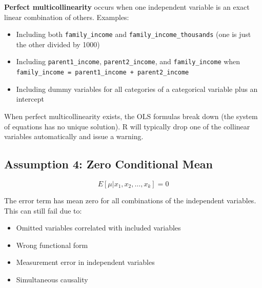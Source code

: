 \documentclass[
  letterpaper,
  DIV=11,
  numbers=noendperiod]{scrreprt}
\providecommand{\tightlist}{%
  \setlength{\itemsep}{0pt}\setlength{\parskip}{0pt}}
\begin{document}
\begin{tcolorbox}[enhanced jigsaw, arc=.35mm, bottomrule=.15mm, bottomtitle=1mm, breakable, colback=white, colbacktitle=quarto-callout-warning-color!10!white, colframe=quarto-callout-warning-color-frame, coltitle=black, left=2mm, leftrule=.75mm, opacityback=0, opacitybacktitle=0.6, rightrule=.15mm, title=\textcolor{quarto-callout-warning-color}{\faExclamationTriangle}\hspace{0.5em}{Perfect Multicollinearity}, titlerule=0mm, toprule=.15mm, toptitle=1mm]

\textbf{Perfect multicollinearity} occurs when one independent variable
is an exact linear combination of others. Examples:

\begin{itemize}
\tightlist
\item
  Including both \texttt{family\_income} and
  \texttt{family\_income\_thousands} (one is just the other divided by
  1000)
\item
  Including \texttt{parent1\_income}, \texttt{parent2\_income}, and
  \texttt{family\_income} when
  \texttt{family\_income\ =\ parent1\_income\ +\ parent2\_income}
\item
  Including dummy variables for all categories of a categorical variable
  plus an intercept
\end{itemize}

When perfect multicollinearity exists, the OLS formulas break down (the
system of equations has no unique solution). R will typically drop one
of the collinear variables automatically and issue a warning.

\end{tcolorbox}

\subsection{Assumption 4: Zero Conditional
Mean}\label{assumption-4-zero-conditional-mean-1}

\[
E[\mu | x_1, x_2, \ldots, x_k] = 0
\]

The error term has mean zero for all combinations of the independent
variables. This can still fail due to:

\begin{itemize}
\tightlist
\item
  Omitted variables correlated with included variables
\item
  Wrong functional form
\item
  Measurement error in independent variables
\item
  Simultaneous causality
\end{itemize}
\end{document}
